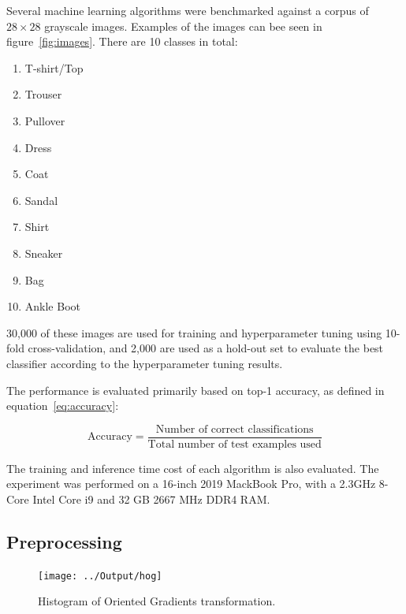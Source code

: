 \documentclass[landscape,twocolumn]{article}
\begin{document}
Several machine learning algorithms were benchmarked against a corpus of $28 \times 28$ grayscale images. Examples of the images can bee seen in figure~\ref{fig:images}. There are 10 classes in total:
\begin{enumerate}
	\item T-shirt/Top
	\item Trouser
	\item Pullover
	\item Dress
	\item Coat
	\item Sandal
	\item Shirt
	\item Sneaker
	\item Bag
	\item Ankle Boot
\end{enumerate}

30,000 of these images are used for training and hyperparameter tuning using 10-fold cross-validation, and 2,000 are used as a hold-out set to evaluate the best classifier according to the hyperparameter tuning results.

The performance is evaluated primarily based on top-1 accuracy, as defined in equation~\ref{eq:accuracy}:

\begin{equation}
	\label{eq:accuracy}
	\text{Accuracy} = \frac{\text{Number of correct classifications}}{\text{Total number of test examples used}}
\end{equation}

The training and inference time cost of each algorithm is also evaluated. The experiment was performed on a 16-inch 2019 MackBook Pro, with a 2.3GHz 8-Core Intel Core i9 and 32 GB 2667 MHz DDR4 RAM\@.

\subsection{Preprocessing}
\begin{figure}[ht]
	\texttt{[image: ../Output/hog]}
	\caption{Histogram of Oriented Gradients transformation.}\label{fig:hog}
\end{figure}
\end{document}
